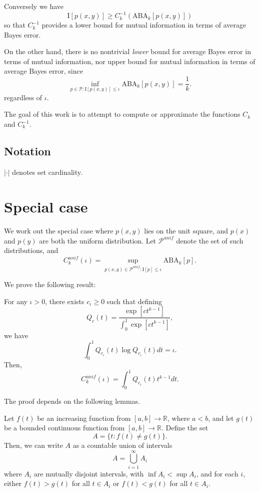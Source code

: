 \documentclass[12pt]{article}
\begin{document}
Conversely we have
\[
\text{I}[p(x,y)] \geq C^{-1}_k(\text{ABA}_k[p(x,y)])
\]
so that $C^{-1}_k$ provides a lower bound for mutual information in terms of average Bayes error.

On the other hand, there is no nontrivial \emph{lower} bound for average Bayes error in terms of mutual information,
nor upper bound for mutual information in terms of average Bayes error, since
\[
\inf_{p \in \mathcal{P}: \text{I}[p(x,y)] \leq \iota} \text{ABA}_k[p(x,y)] = \frac{1}{k}.
\]
regardless of $\iota$.

The goal of this work is to attempt to compute or approximate the functions $C_k$ and $C_k^{-1}$.

\subsection{Notation}

$|\cdot|$ denotes set cardinality.

\section{Special case}

We work out the special case where $p(x,y)$ lies on the unit square, and $p(x)$ and $p(y)$ are both the uniform distribution.
Let $\mathcal{P}^{unif}$ denote the set of such distributions, and 
\[
C_k^{unif}(\iota) = \sup_{p(x, y) \in \mathcal{P}^{unif}: \text{I}[p] \leq \iota} \text{ABA}_k[p]. 
\]

We prove the following result:

\begin{theorem}\label{theorem:Cunif}
For any $\iota > 0$, there exists $c_\iota \geq 0$ such that defining
\[
Q_c(t) = \frac{\exp[ct^{k-1}]}{\int_0^1 \exp[ct^{k-1}]},
\]
we have
\[
\int_0^1 Q_{c_\iota}(t) \log Q_{c_\iota}(t) dt = \iota.
\]
Then,
\[
C_k^{unif}(\iota) = \int_0^1 Q_{c_\iota}(t) t^{k-1} dt.
\]
\end{theorem}

The proof depends on the following lemmas.

\begin{lemma}\label{lemma:technical1}
Let $f(t)$ be an increasing function from $[a, b] \to \mathbb{R}$, where $a < b$,
and let $g(t)$ be a bounded continuous function from $[a, b] \to \mathbb{R}$.
Define the set
\[
A = \{t: f(t) \neq g(t)\}.
\]
Then, we can write $A$ as a countable union of intervals
\[
A = \bigcup_{i=1}^\infty A_i
\]
where $A_i$ are mutually disjoint intervals, with $\inf A_i < \sup
A_i$, and for each $i$, either $f(t) > g(t)$ for all $t \in A_i$ or
$f(t) < g(t)$ for all $t \in A_i$.
\end{lemma}
\end{document}
